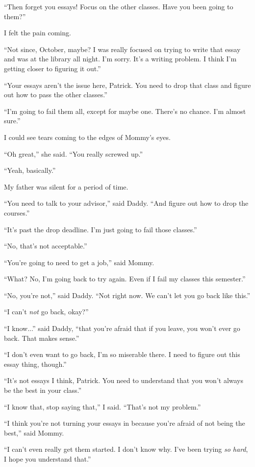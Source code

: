 ``Then forget you essays!  Focus on the other classes.  Have you been going to
them?''

I felt the pain coming.

``Not since, October, maybe?  I was really focused on trying to write that essay
and was at the library all night.  I'm sorry.  It's a writing problem.  I think
I'm getting closer to figuring it out.''
 
``Your essays aren't the issue here, Patrick.  You need to drop that class and
figure out how to pass the other classes.''

``I'm going to fail them all, except for maybe one.  There's no chance.  I'm
almost sure.''

I could see tears coming to the edges of Mommy's eyes.

``Oh great,'' she said.  ``You really screwed up.''

``Yeah, basically.''

My father was silent for a period of time.

``You need to talk to your advisor,'' said Daddy.  ``And figure out how to drop the
courses.''

``It's past the drop deadline.  I'm just going to fail those classes.''

``No, that's not acceptable.''

``You're going to need to get a job,'' said Mommy.

``What?  No, I'm going back to try again.  Even if I fail my classes this semester.''

``No, you're not,'' said Daddy.  ``Not right now.  We can't let you go back like this.''

``I can't \textit{not} go back, okay?''

``I know...'' said Daddy, ``that you're afraid that if you leave, you won't ever go
back.  That makes sense.''

``I don't even want to go back, I'm so miserable there.  I need to figure out
this essay thing, though.''

``It's not essays I think, Patrick.  You need to understand that you won't always be the
best in your class.''

``I know that, stop saying that,'' I said.  ``That's not my problem.''

``I think you're not turning your essays in because you're afraid of not being
the best,'' said Mommy.

``I can't even really get them started.  I don't know why.  I've been trying
\textit{so hard}, I hope you understand that.''

